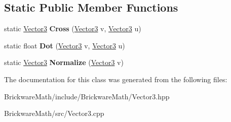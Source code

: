 \subsection*{Static Public Member Functions}
\begin{DoxyCompactItemize}
\item 
\hypertarget{classBrickware_1_1Math_1_1Vector3_a4a8f7afc24aae3c4f26064e07d624d08}{}static \hyperlink{classBrickware_1_1Math_1_1Vector3}{Vector3} {\bfseries Cross} (\hyperlink{classBrickware_1_1Math_1_1Vector3}{Vector3} v, \hyperlink{classBrickware_1_1Math_1_1Vector3}{Vector3} u)\label{classBrickware_1_1Math_1_1Vector3_a4a8f7afc24aae3c4f26064e07d624d08}

\item 
\hypertarget{classBrickware_1_1Math_1_1Vector3_a0adf0f3f8722666185c32384b86ae972}{}static float {\bfseries Dot} (\hyperlink{classBrickware_1_1Math_1_1Vector3}{Vector3} v, \hyperlink{classBrickware_1_1Math_1_1Vector3}{Vector3} u)\label{classBrickware_1_1Math_1_1Vector3_a0adf0f3f8722666185c32384b86ae972}

\item 
\hypertarget{classBrickware_1_1Math_1_1Vector3_a7fb3e2bc21763bd8adec7fc134cd0e0b}{}static \hyperlink{classBrickware_1_1Math_1_1Vector3}{Vector3} {\bfseries Normalize} (\hyperlink{classBrickware_1_1Math_1_1Vector3}{Vector3} v)\label{classBrickware_1_1Math_1_1Vector3_a7fb3e2bc21763bd8adec7fc134cd0e0b}

\end{DoxyCompactItemize}


The documentation for this class was generated from the following files\+:\begin{DoxyCompactItemize}
\item 
Brickware\+Math/include/\+Brickware\+Math/Vector3.\+hpp\item 
Brickware\+Math/src/Vector3.\+cpp\end{DoxyCompactItemize}
